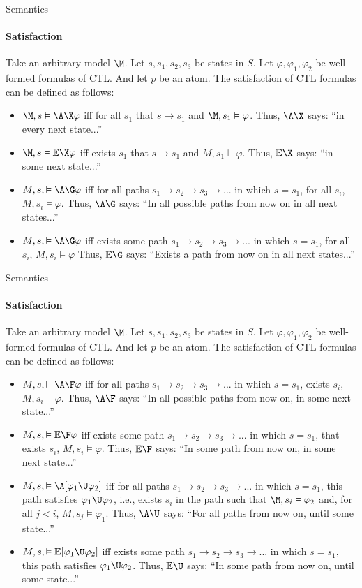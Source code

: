 \begin{frame}{Semantics}
	\framesubtitle{Satisfaction}
	Take an arbitrary model $\M$. Let $s, s_1, s_2, s_3$ be states in $S$. Let $\varphi, \varphi_1, \varphi_2$ be well-formed formulas of CTL. And let $p$ be an atom. The satisfaction of CTL formulas can be defined as follows:
	\begin{itemize}
		\item $\M,s \vDash \A\X \varphi$ iff for all $s_1$ that $s \to s_1$ and $\M,s_1 \vDash \varphi$. Thus, $\A\X$ says: ``in every next state...''\pause
		\item $\M,s \vDash \E\X \varphi$ iff exists $s_1$ that $s \to s_1$ and $M,s_1 \vDash \varphi$. Thus, $\E\X$ says: ``in some next state...''\pause
		\item $M,s, \vDash \A\G \varphi$ iff for all paths $s_1 \to s_2 \to s_3 \to ...$ in which $s = s_1$, for all $s_i$, $M, s_i \vDash \varphi$. Thus, $\A\G$ says: ``In all possible paths from now on in all next states...''\pause
		\item $M,s, \vDash \A\G \varphi$ iff exists some path $s_1 \to s_2 \to s_3 \to ...$ in which $s = s_1$, for all $s_i$, $M, s_i \vDash \varphi$ Thus, $\E\G$ says: ``Exists a path from now on in all next states...''\pause
	\end{itemize}
\end{frame}

\begin{frame}{Semantics}
	\framesubtitle{Satisfaction}
	Take an arbitrary model $\M$. Let $s, s_1, s_2, s_3$ be states in $S$. Let $\varphi, \varphi_1, \varphi_2$ be well-formed formulas of CTL. And let $p$ be an atom. The satisfaction of CTL formulas can be defined as follows:
	\begin{itemize}
		\item $M,s, \vDash \A\F \varphi$ iff for all paths $s_1 \to s_2 \to s_3 \to ...$ in which $s = s_1$, exists $s_i$, $M, s_i \vDash \varphi$. Thus, $\A\F$ says: ``In all possible paths from now on, in some next state...''\pause
		\item $M,s, \vDash \E\F \varphi$ iff exists some path $s_1 \to s_2 \to s_3 \to ...$ in which $s = s_1$, that exists $s_i$, $M, s_i \vDash \varphi$. Thus, $\E\F$ says: ``In some path from now on, in some next state...''\pause
		\item $M,s, \vDash \A[\varphi_1 \U \varphi_2]$ iff for all paths $s_1 \to s_2 \to s_3 \to ...$ in which $s = s_1$, this path satisfies $\varphi_1 \U \varphi_2$, i.e., exists $s_i$ in the path such that $\M, s_i \vDash \varphi_2$ and, for all $j < i$, $M, s_j \vDash \varphi_1$. Thus, $\A\U$ says: ``For all paths from now on, until some state...''\pause
		\item $M,s, \vDash \E[\varphi_1 \U \varphi_2]$ iff exists some path $s_1 \to s_2 \to s_3 \to ...$ in which $s = s_1$, this path satisfies $\varphi_1 \U \varphi_2$. Thus, $\E\U$ says: ``In some path from now on, until some state...''\pause
	\end{itemize}
\end{frame}